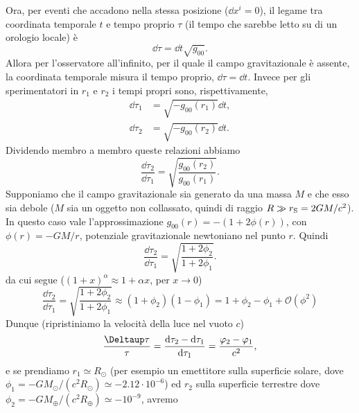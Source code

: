 Ora, per eventi che accadono nella stessa posizione ($\dd x^i=0$), il legame tra
coordinata temporale $t$ e tempo proprio $\tau$ (il tempo che sarebbe letto su
di un orologio locale) è
\begin{equation}
  \dd \tau = \dd t \sqrt{g_{00}}.
\end{equation}
Allora per l'osservatore all'infinito, per il quale il campo gravitazionale è
assente, la coordinata temporale misura il tempo proprio, $\dd\tau = \dd t$.
Invece per gli sperimentatori in $r_{1}$ e $r_{2}$ i tempi propri sono,
rispettivamente,
\begin{subequations}
  \begin{align}
    \dd\tau_{1} &= \sqrt{-g_{00}(r_{1})} \dd t, \\
    \dd\tau_{2} &= \sqrt{-g_{00}(r_{2})} \dd t.
  \end{align}
\end{subequations}
Dividendo membro a membro queste relazioni abbiamo
\begin{equation}
  \frac{\dd \tau_{2}}{\dd \tau_{1}} =
  \sqrt{\frac{g_{00}(r_{2})}{g_{00}(r_{1})}}.
\end{equation}
Supponiamo che il campo gravitazionale sia generato da una massa $M$ e che esso
sia debole ($M$ sia un oggetto non collassato, quindi di raggio $ R \gg
r_{\textup{S}} = 2GM/c^2$).  In questo caso vale l'approssimazione $g_{00}(r) =
-(1 + 2\phi(r))$, con $\phi(r)=-GM/r$, potenziale gravitazionale newtoniano nel
punto $r$.  Quindi
\begin{equation}
  \frac{\dd\tau_{2}}{\dd\tau_{1}} = \sqrt{\frac{1 + 2\phi_{2}}{1 + 2\phi_{1}}}.
\end{equation}
da cui segue ($(1+x)^{\alpha} \approx 1 + \alpha x$, per $x \to 0$)
\begin{equation}
  \frac{\dd \tau_{2}}{\dd \tau_{1}} =
  \sqrt{\frac{1 + 2\phi_{2}}{1 + 2\phi_{1}}} \approx (1 + \phi_{2}) (1 -
  \phi_{1}) = 1 + \phi_{2} - \phi_{1} + \mathcal{O}(\phi^{2}) 
\end{equation}
Dunque (ripristiniamo la velocità della luce nel vuoto $c$)
\begin{equation}
  \frac{\var\tau}{\tau} = \frac{\dd\tau_{2} - \dd\tau_{1}}{\dd\tau_{1}} =
  \frac{\phi_{2} - \phi_{1}}{c^{2}},
\end{equation}
e se prendiamo $r_1 \simeq R_\odot$ (per esempio un emettitore sulla superficie
solare, dove $\phi_1 = - GM_{\odot}/(c^2 R_{\odot}) \simeq -2.12 \cdot 10^{-6}$)
ed $r_2$ sulla superficie terrestre dove $\phi_2 = -GM_{\oplus}/(c^2 R_{\oplus})
\simeq - 10^{-9}$, avremo
